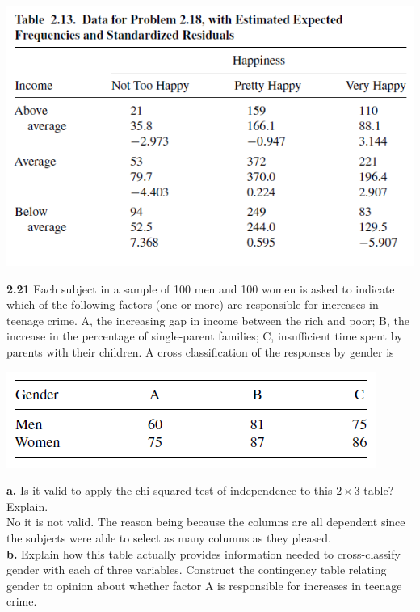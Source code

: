 \documentclass[paper=letter, fontsize=11pt]{scrartcl} %
\begin{document}
\begin{center}
	\includegraphics[scale=.55]{table213.png}
\end{center}
\textbf{2.21} Each subject in a sample of 100 men and 100 women is asked to indicate which
of the following factors (one or more) are responsible for increases in teenage crime. A,
the increasing gap in income between the rich and poor; B, the increase in the percentage
of single-parent families; C, insufficient time spent by parents with their children. A 
cross classification of the responses by gender is \\

\begin{center}
	\includegraphics[scale=.75]{contTable221.png}
\end{center}

\textbf{a.} Is it valid to apply the chi-squared test of independence to this $2 \times 3$
table? Explain. \\
No it is not valid. The reason being because the columns are all dependent since the
subjects were able to select as many columns as they pleased. \\

\textbf{b.} Explain how this table actually provides information needed to cross-classify
gender with each of three variables. Construct the contingency table relating gender to
opinion about whether factor A is responsible for increases in teenage crime. \\
\end{document}
